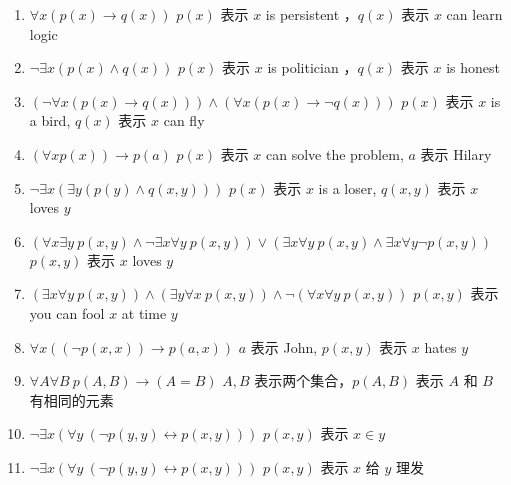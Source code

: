 \documentclass[UTF8]{ctexart}
\begin{document}
    \begin{enumerate}
        \item $\forall x (p(x) \to q(x))$ \newline
        $p(x)$ 表示 $x$ is persistent ，$q(x)$ 表示 $x$ can learn logic
        \item $\lnot \exists x (p(x) \land q(x))$ \newline
        $p(x)$ 表示 $x$ is politician ，$q(x)$ 表示 $x$ is honest
        \item $(\lnot \forall x (p(x) \to q(x))) \land (\forall x (p(x) \to \lnot q(x)))$\newline
        $p(x)$ 表示 $x$ is a bird, $q(x)$ 表示 $x$ can fly
        \item $(\forall x p(x)) \to p(a)$ \newline
        $p(x)$ 表示 $x$ can solve the problem, $a$ 表示 Hilary
        \item $\lnot \exists x (\exists y (p(y) \land q(x, y)))$ \newline
        $p(x)$ 表示 $x$ is a loser, $q(x, y)$ 表示 $x$ loves $y$
        \item $(\forall x \exists y\ p(x, y) \land \lnot \exists x \forall y\ p(x, y)) \lor (\exists x \forall y\ p(x, y) \land \exists x \forall y \lnot p(x, y))$ \newline
        $p(x, y)$ 表示 $x$ loves $y$
        \item $(\exists x \forall y\ p(x, y)) \land (\exists y \forall x\ p(x, y)) \land \lnot (\forall x \forall y\ p(x, y))$ \newline
        $p(x, y)$ 表示 you can fool $x$ at time $y$
        \item $\forall x ((\lnot p(x, x)) \to p(a, x) )$ \newline
        $a$ 表示 John, $p(x, y)$ 表示 $x$ hates $y$
        \item $\forall A \forall B\ p(A, B) \to (A=B)$ \newline
        $A, B$ 表示两个集合，$p(A, B)$ 表示 $A$ 和 $B$ 有相同的元素
        \item $\lnot \exists x (\forall y\ (\lnot p(y, y) \leftrightarrow p(x, y)) )$ \newline
        $p(x, y)$ 表示 $x \in y$
        \item $\lnot \exists x (\forall y\ (\lnot p(y, y) \leftrightarrow p(x, y)) )$ \newline
        $p(x, y)$ 表示 $x$ 给 $y$ 理发
    \end{enumerate}
\end{document}
